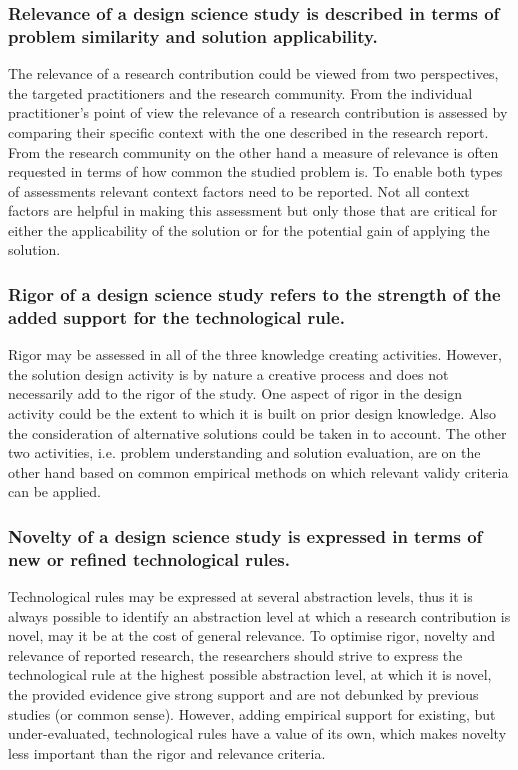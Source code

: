 \documentclass[graybox]{svmult}
\begin{document}
\subsubsection{Relevance of a design science study is described in terms of problem similarity and solution applicability.} The relevance of a research contribution could be viewed from two perspectives, the targeted practitioners and the research community. From the individual practitioner's point of view the relevance of a research contribution is assessed by comparing their specific context with the one described in the research report. From the research community on the other hand a measure of relevance is often requested in terms of how common the studied problem is. To enable both types of assessments relevant context factors need to be reported. Not all context factors are helpful in making this assessment but only those that are critical for either the applicability of the solution or for the potential gain of applying the solution. 


\subsubsection{Rigor of a design science study refers to the strength of the added support for the technological rule.} Rigor may be assessed in all of the three knowledge creating activities. However, the solution design activity is by nature a creative process and does not necessarily add to the rigor of the study. One aspect of rigor in the design activity could be the extent to which it is built on prior design knowledge. Also the consideration of alternative solutions could be taken in to account. The other two activities, i.e. problem understanding and solution evaluation, are on the other hand based on common empirical methods on which relevant validy criteria can be applied. 

\subsubsection{Novelty of a design science study is expressed in terms of new or refined technological rules.} Technological rules may be expressed at several abstraction levels, thus it is always possible to identify an abstraction level at which a research contribution is novel, may it be at the cost of general relevance. To optimise rigor, novelty and relevance of reported research, the researchers should strive to express the technological rule at the highest possible abstraction level, at which it is novel, the provided evidence give strong support and are not debunked by previous studies (or common sense). However, adding empirical support for existing, but under-evaluated, technological rules have a value of its own, which makes novelty less important than the rigor and relevance criteria.
\end{document}

